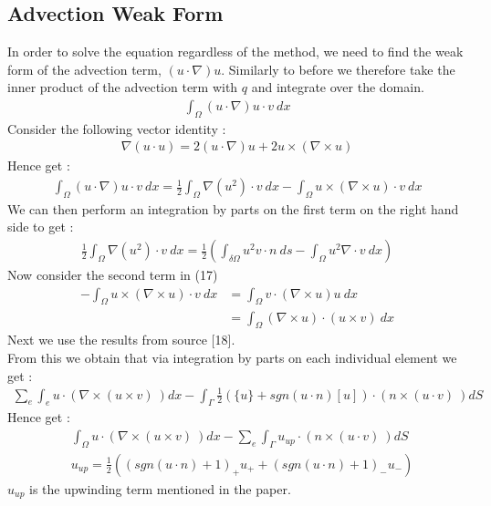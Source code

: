 \documentclass[11pt,twoside,a4paper]{article}
\begin{document}
\subsection{Advection Weak Form}
In order to solve the equation regardless of the method, we need to find the weak form of the advection term, $(u \cdot \nabla) u$.
Similarly to before we therefore take the inner product of the advection term with $q$ and integrate over the domain.
\begin{align}
\int_\Omega (u \cdot \nabla)u \cdot v \ dx
\end{align}
Consider the following vector identity :
\begin{align*}
\nabla (u \cdot u) = 2 (u \cdot \nabla) u + 2 u \times (\nabla \times u)
\end{align*}
Hence get :
\begin{align}
\int_\Omega (u \cdot \nabla)u \cdot v \ dx = \frac{1}{2} \int_\Omega \nabla (u^2) \cdot v \ dx - \int_{\Omega} u \times (\nabla \times u) \cdot v \ dx
\end{align}
We can then perform an integration by parts on the first term on the right hand side to get :
\begin{align}
 \frac{1}{2} \int_\Omega \nabla (u^2) \cdot v \ dx = \frac{1}{2} (\int_{\delta \Omega } u^2 v \cdot n \ ds - \int_\Omega u^2 \nabla \cdot v \ dx)
\end{align}
Now consider the second term in (17)
\begin{align*}
- \int_{\Omega} u \times (\nabla \times u) \cdot v \ dx &= \int_{\Omega} v \cdot (\nabla \times u) u \ dx   \\
&=  \int_{\Omega} (\nabla \times u) \cdot (u \times v)  \ dx
\end{align*}
Next we use the results from source [18].\\
From this we obtain that via integration by parts on each individual element we get :
\begin{align*}
\sum_e \int_e u \cdot (\nabla \times (u \times v) \ ) dx - \int_{\Gamma} \frac{1}{2}(\{u\} + sgn(u \cdot n)[u]) \cdot (n \times (u \cdot v) \ ) dS
\end{align*}
Hence get :
\begin{align}
&\int_\Omega u \cdot (\nabla \times (u \times v) \ ) dx -  \sum_e \int_{\Gamma} u_{up} \cdot (n \times (u \cdot v) \ ) dS \\
& u_{up} = \frac{1}{2}((sgn(u \cdot n) + 1)_+ u_+ + (sgn (u \cdot n) +1)_- u_-)
\end{align}
$u_{up}$ is the upwinding term mentioned in the paper.\\
\end{document}
